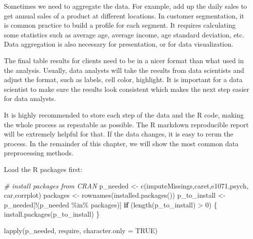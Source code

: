 \documentclass[
  12pt,
]{krantz}
\makeatletter
\newenvironment{Shaded}{\begin{snugshade}}{\end{snugshade}}
\newcommand{\AttributeTok}[1]{\textcolor[rgb]{0.61,0.61,0.61}{#1}}
\newcommand{\CommentTok}[1]{\textcolor[rgb]{0.37,0.37,0.37}{\textit{#1}}}
\newcommand{\ConstantTok}[1]{\textcolor[rgb]{0,0,0}{#1}}
\newcommand{\ControlFlowTok}[1]{\textcolor[rgb]{0.27,0.27,0.27}{\textbf{#1}}}
\newcommand{\DecValTok}[1]{\textcolor[rgb]{0.06,0.06,0.06}{#1}}
\newcommand{\FunctionTok}[1]{\textcolor[rgb]{0,0,0}{#1}}
\newcommand{\NormalTok}[1]{#1}
\newcommand{\OtherTok}[1]{\textcolor[rgb]{0.37,0.37,0.37}{#1}}
\newcommand{\SpecialCharTok}[1]{\textcolor[rgb]{0,0,0}{#1}}
\newcommand{\StringTok}[1]{\textcolor[rgb]{0.5,0.5,0.5}{#1}}
\newenvironment{kframe}{%
\medskip{}
\setlength{\fboxsep}{.8em}
 \def\at@end@of@kframe{}%
 \ifinner\ifhmode%
  \def\at@end@of@kframe{\end{minipage}}%
  \begin{minipage}{\columnwidth}%
 \fi\fi%
 \def\FrameCommand##1{\hskip\@totalleftmargin \hskip-\fboxsep
 \colorbox{shadecolor}{##1}\hskip-\fboxsep
     \hskip-\linewidth \hskip-\@totalleftmargin \hskip\columnwidth}%
 \MakeFramed {\advance\hsize-\width
   \@totalleftmargin\z@ \linewidth\hsize
   \@setminipage}}%
 {\par\unskip\endMakeFramed%
 \at@end@of@kframe}
\renewenvironment{Shaded}{\begin{kframe}}{\end{kframe}}
\makeatother
\begin{document}
Sometimes we need to aggregate the data. For example, add up the daily sales to get annual sales of a product at different locations. In customer segmentation, it is common practice to build a profile for each segment. It requires calculating some statistics such as average age, average income, age standard deviation, etc. Data aggregation is also necessary for presentation, or for data visualization.

The final table results for clients need to be in a nicer format than what used in the analysis. Usually, data analysts will take the results from data scientists and adjust the format, such as labels, cell color, highlight. It is important for a data scientist to make sure the results look consistent which makes the next step easier for data analysts.

It is highly recommended to store each step of the data and the R code, making the whole process as repeatable as possible. The R markdown reproducible report will be extremely helpful for that. If the data changes, it is easy to rerun the process. In the remainder of this chapter, we will show the most common data preprocessing methods.

Load the R packages first:

\begin{Shaded}
\begin{Highlighting}[]
\CommentTok{\# install packages from CRAN}
\NormalTok{p\_needed }\OtherTok{\textless{}{-}} \FunctionTok{c}\NormalTok{(}\StringTok{\textquotesingle{}imputeMissings\textquotesingle{}}\NormalTok{,}\StringTok{\textquotesingle{}caret\textquotesingle{}}\NormalTok{,}\StringTok{\textquotesingle{}e1071\textquotesingle{}}\NormalTok{,}\StringTok{\textquotesingle{}psych\textquotesingle{}}\NormalTok{,}
              \StringTok{\textquotesingle{}car\textquotesingle{}}\NormalTok{,}\StringTok{\textquotesingle{}corrplot\textquotesingle{}}\NormalTok{)}
\NormalTok{packages }\OtherTok{\textless{}{-}} \FunctionTok{rownames}\NormalTok{(}\FunctionTok{installed.packages}\NormalTok{())}
\NormalTok{p\_to\_install }\OtherTok{\textless{}{-}}\NormalTok{ p\_needed[}\SpecialCharTok{!}\NormalTok{(p\_needed }\SpecialCharTok{\%in\%}\NormalTok{ packages)]}
\ControlFlowTok{if}\NormalTok{ (}\FunctionTok{length}\NormalTok{(p\_to\_install) }\SpecialCharTok{\textgreater{}} \DecValTok{0}\NormalTok{) \{}
    \FunctionTok{install.packages}\NormalTok{(p\_to\_install)}
\NormalTok{\}}

\FunctionTok{lapply}\NormalTok{(p\_needed, require, }\AttributeTok{character.only =} \ConstantTok{TRUE}\NormalTok{)}
\end{Highlighting}
\end{Shaded}
\end{document}
